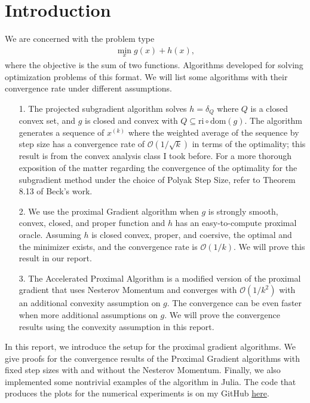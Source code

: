 \documentclass[]{article}
\theoremstyle{definition}
\begin{document}
\section{Introduction}
    We are concerned with the problem type
    \begin{align}
        \min_{x} g(x) + h(x),
    \end{align}
    where the objective is the sum of two functions. Algorithms developed for solving optimization problems of this format. We will list some algorithms with their convergence rate under different assumptions. 
    \begin{enumerate}
        \item [1.] The projected subgradient algorithm solves $h = \delta_Q$ where $Q$ is a closed convex set, and $g$ is closed and convex with $Q\subseteq\text{ri}\circ \text{dom}(g)$. The algorithm generates a sequence of $x^{(k)}$ where the weighted average of the sequence by step size has a convergence rate of $\mathcal O(1/\sqrt{k})$ in terms of the optimality; this result is from the convex analysis class I took before. For a more thorough exposition of the matter regarding the convergence of the optimality for the subgradient method under the choice of Polyak Step Size, refer to Theorem 8.13 of Beck's work\cite{book:first_order_opt}. 
        \item [2.] We use the proximal Gradient algorithm when $g$ is strongly smooth, convex, closed, and proper function and $h$ has an easy-to-compute proximal oracle. Assuming $h$ is closed convex, proper, and coersive, the optimal and the minimizer exists, and the convergence rate is $\mathcal O(1/k)$. We will prove this result in our report. 
        \item [3.] The Accelerated Proximal Algorithm is a modified version of the proximal gradient that uses Nesterov Momentum and converges with $\mathcal O(1/k^2)$ with an additional convexity assumption on $g$. The convergence can be even faster when more additional assumptions on $g$. We will prove the convergence results using the convexity assumption in this report.  
    \end{enumerate}
    In this report, we introduce the setup for the proximal gradient algorithms. We give proofs for the convergence results of the Proximal Gradient algorithms with fixed step sizes with and without the Nesterov Momentum. Finally, we also implemented some nontrivial examples of the algorithm in Julia. The code that produces the plots for the numerical experiments is on my GitHub \href{https://github.com/iluvjava/Proximal-Gradient}{here}. 
\end{document}
